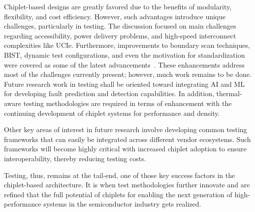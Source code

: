 \documentclass[acmtog, 12pt]{acmart}
\begin{document}

Chiplet-based designs are greatly favored due to the benefits of modularity, flexibility, and cost efficiency. However, such advantages introduce unique challenges, particularly in testing. The discussion focused on main challenges regarding accessibility, power delivery problems, and high-speed interconnect complexities like UCIe. Furthermore, improvements to boundary scan techniques, BIST, dynamic test configurations, and even the motivation for standardization were covered as some of the latest advancements~\cite{10365967, 10766679, 9824550, 6515989}.
These enhancements address most of the challenges currently present; however, much work remains to be done. Future research work in testing shall be oriented toward integrating AI and ML for developing fault prediction and detection capabilities. In addition, thermal-aware testing methodologies are required in terms of enhancement with the continuing development of chiplet systems for performance and density.

Other key areas of interest in future research involve developing common testing frameworks that can easily be integrated across different vendor ecosystems. Such frameworks will become highly critical with increased chiplet adoption to ensure interoperability, thereby reducing testing costs.

Testing, thus, remains at the tail-end, one of those key success factors in the chiplet-based architecture. It is when test methodologies further innovate and are refined that the full potential of chiplets for enabling the next generation of high-performance systems in the semiconductor industry gets realized.



\end{document}
